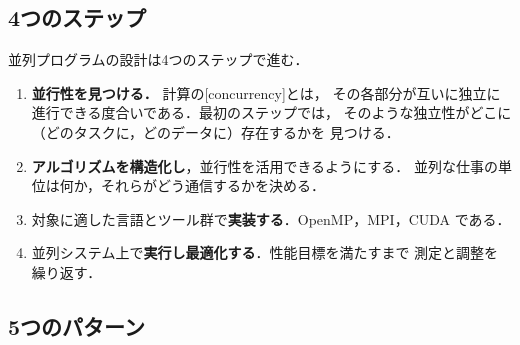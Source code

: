 \documentclass[../main.tex]{subfiles}
\begin{document}
\subsection{4つのステップ}

並列プログラムの設計は4つのステップで進む．
\begin{enumerate}
  \item \textbf{並行性を見つける．} 計算の[concurrency]とは，
    その各部分が互いに独立に進行できる度合いである．最初のステップでは，
    そのような独立性がどこに（どのタスクに，どのデータに）存在するかを
    見つける．
  \item \textbf{アルゴリズムを構造化し}，並行性を活用できるようにする．
    並列な仕事の単位は何か，それらがどう通信するかを決める．
  \item 対象に適した言語とツール群で\textbf{実装する}．OpenMP，MPI，CUDA
    である．
  \item 並列システム上で\textbf{実行し最適化する}．性能目標を満たすまで
    測定と調整を繰り返す．
\end{enumerate}

\subsection{5つのパターン}
\end{document}
